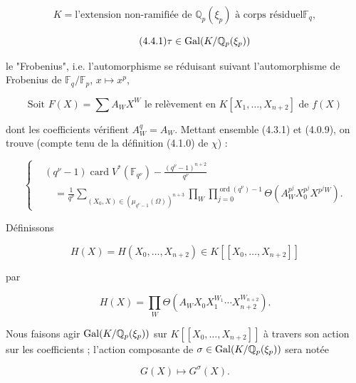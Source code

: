 \begin{equation}\tag{4.4.0}
K=\text{l'extension non-ramifiée de $\mathbb Q_p(\xi_p)$ à corps résiduel
$\mathbb F_q$},
\end{equation}

\begin{equation}\tag{4.4.1}
\tau\in\operatorname{Gal}(K/\mathbb Q_p(\xi_p))
\end{equation}

le "Frobenius", i.e. l'automorphisme se réduisant suivant l'automorphisme
de Frobenius de $\mathbb F_q/\mathbb F_p$, $x\longmapsto x^p$,

\begin{equation}\tag{4.4.2}
\text{Soit }F(X)=\sum A_WX^W
\text{ le relèvement en $K[X_1,\ldots,X_{n+2}]$ de $f(X)$}
\end{equation}

dont les coefficients vérifient $A_W^q=A_W$. Mettant ensemble (4.3.1) et
(4.0.9), on trouve (compte tenu de la définition (4.1.0) de $\chi$) :

\begin{equation}\tag{4.4.3}
\left\{
\begin{aligned}
&(q^\nu-1)\operatorname{card}V^*(\mathbb F_{q^\nu})
-\frac{(q^\nu-1)^{n+2}}{q^\nu}\\
&\quad=\frac1{q^\nu}
\sum_{(X_0,X)\in(\mu_{q^\nu-1}(\Omega))^{n+3}}
\prod_W\prod_{j=0}^{\operatorname{ord}(q^\nu)-1}
\Theta\!\left(A_W^{p^j}X_0^{p^j}X^{p^jW}\right).
\end{aligned}
\right.
\end{equation}

Définissons

\[
H(X)=H(X_0,\ldots,X_{n+2})\in K[[X_0,\ldots,X_{n+2}]]
\]

par

\begin{equation}\tag{4.4.4}
H(X)=\prod_W
\Theta\!\left(A_WX_0X_1^{W_1}\cdots X_{n+2}^{W_{n+2}}\right).
\end{equation}

Nous faisons agir $\operatorname{Gal}(K/\mathbb Q_p(\xi_p))$ sur
$K[[X_0,\ldots,X_{n+2}]]$ à travers son action sur les coefficients ;
l'action composante de $\sigma\in\operatorname{Gal}(K/\mathbb Q_p(\xi_p))$ sera notée

\begin{equation}\tag{4.4.5}
G(X)\longmapsto G^\sigma(X).
\end{equation}



